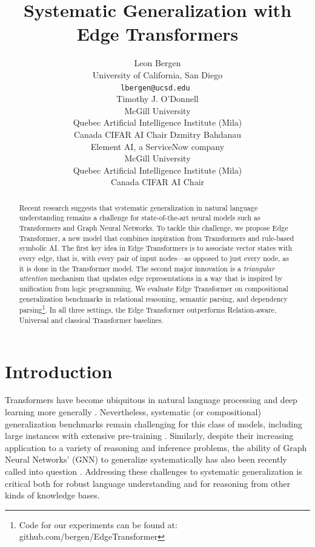 \documentclass{article}
\title{Systematic Generalization with Edge Transformers}
\author{%
  Leon Bergen \\
  University of California, San Diego \\
  \texttt{lbergen@ucsd.edu } \\
  \And
  Timothy J. O'Donnell \\
  McGill University \\
  Quebec Artificial Intelligence Institute (Mila) \\
  Canada CIFAR AI Chair 
  \And 
  Dzmitry Bahdanau \\
  Element AI, a ServiceNow company \\
  McGill University \\
  Quebec Artificial Intelligence Institute (Mila) \\
  Canada CIFAR AI Chair 
}
\begin{document}
\maketitle

\begin{abstract}
  Recent research suggests that systematic generalization in natural
  language understanding remains a challenge for state-of-the-art
  neural models such as Transformers and Graph Neural Networks. To
  tackle this challenge, we propose Edge Transformer, a new model
  that combines inspiration from Transformers and rule-based symbolic
  AI. The first key idea in Edge Transformers is to associate vector
  states with every edge, that is, with every pair of input nodes---as
  opposed to just every node, as it is done in the Transformer model. The
  second major innovation is a \textit{triangular attention} mechanism
  that updates edge representations in a way that is inspired by 
  unification from logic programming. We evaluate Edge Transformer on
  compositional generalization benchmarks in relational reasoning, 
  semantic parsing, and dependency parsing\footnote{Code for our experiments can be found at: github.com/bergen/EdgeTransformer}. In all three settings, the Edge
  Transformer outperforms Relation-aware, Universal and classical
  Transformer baselines.
  \end{abstract}

\section{Introduction}

Transformers \citep{vaswani_attention_2017} have become ubiquitous in
natural language processing and deep learning more generally
\citep[e.g.,][]{devlin_bert_2018,raffel_exploring_2020,carion_end--end_2020}.
Nevertheless, systematic (or compositional) generalization benchmarks
remain challenging for this class of models, including large instances
with extensive pre-training
\citep{keysers_measuring_2020,tsarkov_-cfq_2020,gontier_measuring_2020,
  furrer_compositional_2020}. Similarly, despite their increasing
application to a variety of reasoning and inference problems, the
ability of Graph Neural Networks' (GNN)
\citep{gori_new_2005,scarselli_graph_2009,velickovic_graph_2018} to
generalize systematically has also been recently called into question
\citep{sinha_clutrr_2019,sinha_graphlog_2020}. Addressing these
challenges to systematic generalization is critical both for robust
language understanding and for reasoning from other kinds of knowledge
bases.
\end{document}
